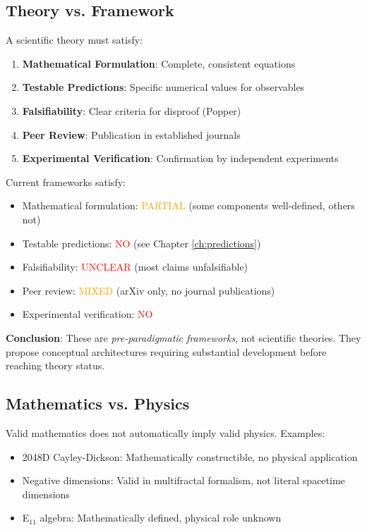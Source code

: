 \subsection{Theory vs. Framework}

\begin{definition}
A scientific theory must satisfy:
\begin{enumerate}
    \item \textbf{Mathematical Formulation}: Complete, consistent equations
    \item \textbf{Testable Predictions}: Specific numerical values for observables
    \item \textbf{Falsifiability}: Clear criteria for disproof (Popper)
    \item \textbf{Peer Review}: Publication in established journals
    \item \textbf{Experimental Verification}: Confirmation by independent experiments
\end{enumerate}
\end{definition}

\begin{assessment}
Current frameworks satisfy:
\begin{itemize}
    \item[1.] Mathematical formulation: \textcolor{orange}{PARTIAL} (some components well-defined, others not)
    \item[2.] Testable predictions: \textcolor{red}{NO} (see Chapter \ref{ch:predictions})
    \item[3.] Falsifiability: \textcolor{red}{UNCLEAR} (most claims unfalsifiable)
    \item[4.] Peer review: \textcolor{orange}{MIXED} (arXiv only, no journal publications)
    \item[5.] Experimental verification: \textcolor{red}{NO}
\end{itemize}
\end{assessment}

\textbf{Conclusion}: These are \textit{pre-paradigmatic frameworks}, not scientific theories. They propose conceptual architectures requiring substantial development before reaching theory status.

\subsection{Mathematics vs. Physics}

\begin{principle}
Valid mathematics does not automatically imply valid physics. Examples:
\begin{itemize}
    \item 2048D Cayley-Dickson: Mathematically constructible, no physical application
    \item Negative dimensions: Valid in multifractal formalism, not literal spacetime dimensions
    \item E$_{11}$ algebra: Mathematically defined, physical role unknown
\end{itemize}
\end{principle}

